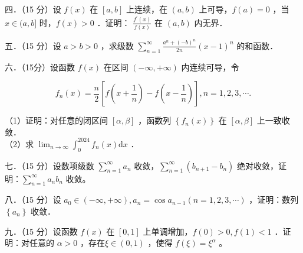 \documentclass{article}
\begin{document}
四．（15 分）设 \(f(x)\) 在 \([a, b]\) 上连续，在 \((a, b)\) 上可导，\(f(a)=0\) ，当 \(x \in(a, b]\) 时，\(f(x)>0\) ．证明： \(\frac{f^{\prime}(x)}{f(x)}\) 在 \((a, b)\) 内无界．

五．（15 分）设 \(a>b>0\) ，求级数 \(\sum_{n=1}^{\infty} \frac{a^{n}+(-b)^{n}}{2 n}(x-1)^{n}\) 的和函数．

六．（15分）设函数 \(f(x)\) 在区间 \((-\infty,+\infty)\) 内连续可导，令

\[
f_{n}(x)=\frac{n}{2}\left[f\left(x+\frac{1}{n}\right)-f\left(x-\frac{1}{n}\right)\right], n=1,2,3, \cdots .
\]

（1）证明：对任意的闭区间 \([\alpha, \beta]\) ，函数列 \(\left\{f_{n}(x)\right\}\) 在 \([\alpha, \beta]\) 上一致收敛．\\
（2）求 \(\lim _{n \rightarrow \infty} \int_{0}^{2024} f_{n}(x) \mathrm{d} x\) ．

七．（15 分）设数项级数 \(\sum_{n=1}^{\infty} a_{n}\) 收敛，\(\sum_{n=1}^{\infty}\left(b_{n+1}-b_{n}\right)\) 绝对收敛，证明：\(\sum_{n=1}^{\infty} a_{n} b_{n}\) 收敛。

八．（15 分）设 \(a_{0} \in(-\infty,+\infty), a_{n}=\cos a_{n-1}(n=1,2,3, \cdots)\) ，证明：数列 \(\left\{a_{n}\right\}\) 收敛．

九．（15 分）设函数 \(f(x)\) 在 \([0,1]\) 上单调增加，\(f(0)>0, f(1)<1\) ．证明：对任意的 \(\alpha>0\) ，存在\(\xi \in(0,1)\) ，使得 \(f(\xi)=\xi^{\alpha}\) 。
\end{document}
